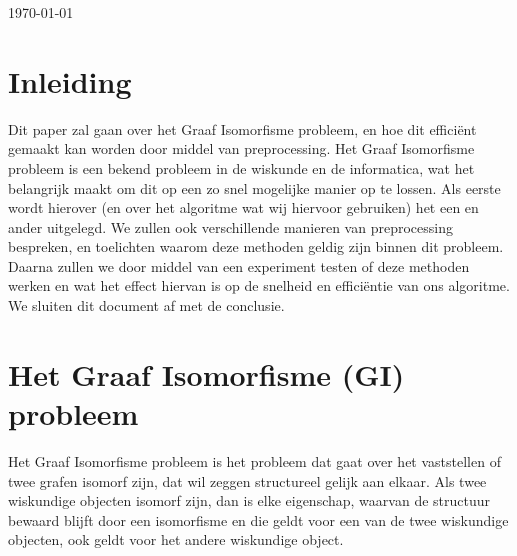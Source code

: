 \documentclass{article}
\begin{document}
\begin{titlepage}

		{\large \today}\\[3cm]

		\pagebreak 						%

\end{titlepage}


\renewcommand*\contentsname{Inhoudsopgave}
\tableofcontents{}
\pagebreak


\section{Inleiding}
Dit paper zal gaan over het Graaf Isomorfisme probleem, en hoe dit effici\"ent gemaakt kan worden door middel van preprocessing. Het Graaf Isomorfisme probleem is een bekend probleem in de wiskunde en de informatica, wat het belangrijk maakt om dit op een zo snel mogelijke manier op te lossen. Als eerste wordt hierover (en over het algoritme wat wij hiervoor gebruiken) het een en ander uitgelegd. We zullen ook verschillende manieren van preprocessing bespreken, en toelichten waarom deze methoden geldig zijn binnen dit probleem. Daarna zullen we door middel van een experiment testen of deze methoden werken en wat het effect hiervan is op de snelheid en effici\"entie van ons algoritme. We sluiten dit document af met de conclusie.
\pagebreak


\section{Het Graaf Isomorfisme (GI) probleem}
Het Graaf Isomorfisme probleem is het probleem dat gaat over het vaststellen of twee grafen isomorf zijn, dat wil zeggen structureel gelijk aan elkaar. Als twee wiskundige objecten isomorf zijn, dan is elke eigenschap, waarvan de structuur bewaard blijft door een isomorfisme en die geldt voor een van de twee wiskundige objecten, ook geldt voor het andere wiskundige object.\\
\end{document}

